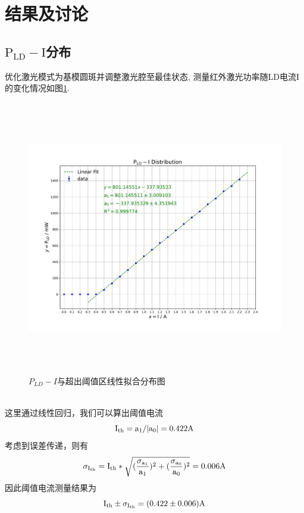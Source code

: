 \documentclass[a4paper]{article}
\begin{document}
\newpage
\section{结果及讨论}
\subsection{$\mathrm{P_{LD} - I}$分布}\label{sub:alu}
优化激光模式为基模圆斑并调整激光腔至最佳状态, 测量红外激光功率随LD电流I的变化情况如图\ref{fig:fig1}. 
\begin{figure}[ht]
 \centering
 \includegraphics[height=12cm, width=16cm]{images/phyex1_fig.pdf}
 \caption{$P_{LD}-I$与超出阈值区线性拟合分布图}
 \label{fig:fig1}
\end{figure}\\
这里通过线性回归，我们可以算出阈值电流
\begin{equation}
\rm I_{th}=a_1/|a_0|=0.422A
\end{equation}
考虑到误差传递，则有
\begin{equation}
\rm \sigma_{I_{th}}=I_{th}*\sqrt{(\frac{\sigma_{a_1}}{a_1})^2+(\frac{\sigma_{a_0}}{a_0})^2}=0.006A\\
\end{equation}
因此阈值电流测量结果为
\begin{equation}
\rm I_{th}\pm\sigma_{I_{th}}=(0.422\pm0.006)A
\end{equation}

\newpage
\end{document}
